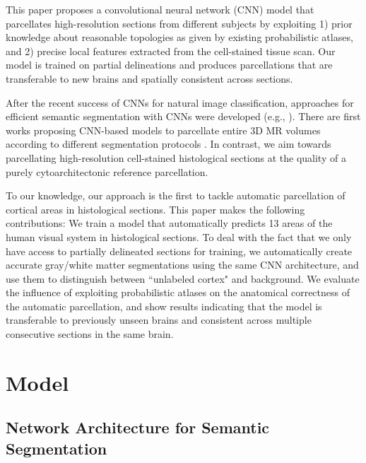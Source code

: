 \documentclass{article}
\begin{document}
This paper proposes a convolutional neural network (CNN) model that parcellates high-resolution sections from different subjects by exploiting 1) prior knowledge about reasonable topologies as given by existing probabilistic atlases, and 2) precise local features extracted from the cell-stained tissue scan.
Our model is trained on partial delineations and produces parcellations that are transferable to new brains and spatially consistent across sections.


After the recent success of CNNs for natural image classification, approaches for efficient semantic segmentation with CNNs were developed (e.g., \cite{ronneberger2015}).
There are first works proposing CNN-based models to parcellate entire 3D MR volumes according to different segmentation protocols \cite{brebisson2015, lee2011}.
In contrast, we aim towards parcellating high-resolution cell-stained histological sections at the quality of a purely cytoarchitectonic reference parcellation.

To our knowledge, our approach is the first to tackle automatic parcellation of cortical areas in histological sections.
This paper makes the following contributions:
We train a model that automatically predicts 13 areas of the human visual system in histological sections.
To deal with the fact that we only have access to partially delineated sections for training,
we automatically create accurate gray/white matter segmentations using the same CNN architecture,
and use them to distinguish between ``unlabeled cortex" and background.
We evaluate the influence of exploiting probabilistic atlases on the anatomical correctness of the automatic parcellation, and show results indicating that the model is transferable to previously unseen brains and consistent across multiple consecutive sections in the same brain.



\section{Model}
\label{sec:arch}
\subsection{Network Architecture for Semantic Segmentation}
\label{sec:arch:arch}
\vspace*{-.5\baselineskip}
\end{document}
